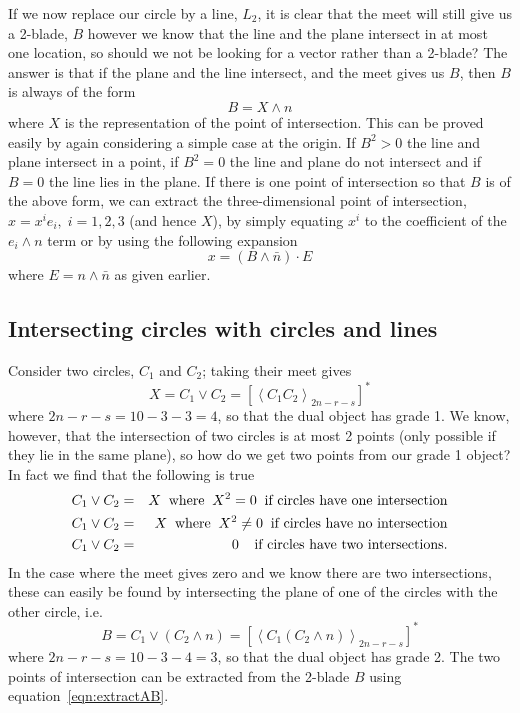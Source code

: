 If we now replace our circle by a line, $L_2$, it is
clear that the meet will still give us a 2-blade, $B$
however we know that the line and the plane intersect in at
most one location, so should we not be looking for a
vector rather than a 2-blade? The answer is that if the
plane and the line intersect, and the meet gives us $B$,
then $B$ is always of the form
%
\[  B = X\wedge n  \]
%
where $X$ is the representation of the point of intersection. This can be
proved easily by again considering a simple case at the
origin. If $B^2>0$ the line and plane intersect in a
point, if $B^2=0$ the line and plane do not intersect and
if $B=0$ the line lies in the plane. If there is one
point of intersection so that $B$ is of the above form,
we can extract the three-dimensional point of intersection,
$x=x^ie_i,\;i=1,2,3$ (and hence $X$), by simply equating
$x^i$ to the coefficient of the $e_i\wedge n$ term or by
using the following expansion
%
\begin{equation}
 x = (B\wedge \bar{n})\cdot E
 \end{equation}
%
where $E=n\wedge \bar{n}$ as given earlier.


\subsection{Intersecting circles with circles and lines }

Consider two circles, $C_1$ and $C_2$; taking their meet
gives
%
\begin{equation}
X = C_1 \vee C_2 = \left[\left< C_1 C_2
\right>_{2n-r-s}\right]^*
\end{equation}
%
where $2n-r-s=10-3-3=4$, so that the dual object has
grade 1. We know, however, that the intersection of two
circles is at most 2 points (only possible if
they lie in the same plane), so how do we get two
points from our grade 1 object? In fact we find
that the following is true
%
\begin{eqnarray}
C_1 \vee C_2  &  =  &  X \;\;\mbox{where}\;\;
X^2=0\;\;\mbox{if circles have one intersection} \nonumber \\
C_1 \vee C_2  &  =  &  X \;\;\mbox{where}\;\;
X^2\ne 0\;\;\mbox{if circles have no intersection} \nonumber \\
C_1 \vee C_2  &  =  &  0 \;\; \;\;\mbox{if circles have
two intersections}.
\end{eqnarray}
%
In the case where the meet gives zero and we know there
are two intersections, these can easily be found by
intersecting the plane of one of the circles with the
other circle, i.e.
%
\begin{equation}
B = C_1 \vee (C_2\wedge n) =  \left[\left< C_1 (C_2\wedge n)
\right>_{2n-r-s}\right]^*
\end{equation}
%
where $2n-r-s=10-3-4=3$, so that the dual object has
grade 2. The two points of intersection can be
extracted from the 2-blade $B$ using
equation~\ref{eqn:extractAB}.

